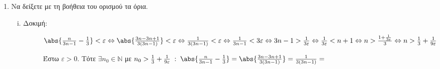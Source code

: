 \begin{enumerate}
            \item Να δείξετε με τη βοήθεια του ορισμού τα όρια.
                \begin{enumerate}[i)]
                    \item 
                        \begin{description}
                            \item [Δοκιμή:] $ \abs{\frac{n}{3n-1} - \frac{1}{3}} < 
                                \varepsilon \Leftrightarrow 
                                \abs{\frac{3n-3n+1}{3(3n-1)}} < \varepsilon 
                                \Leftrightarrow \frac{1}{3(3n-1)} < \varepsilon 
                                \Leftrightarrow \frac{1}{3n-1} < 3 \varepsilon 
                                \Leftrightarrow 3n -1 > \frac{1}{3 \varepsilon} 
                                \Leftrightarrow \frac{1}{3 \varepsilon} < n + 1 
                                \Leftrightarrow n > \frac{1+ \frac{1}{3 \varepsilon}}
                                {3} \Leftrightarrow n > \frac{1}{3} + 
                                \frac{1}{9 \varepsilon}   $

                                Έστω $ \varepsilon >0 $. Τότε $ \exists n_{0} \in 
                                \mathbb{N}$ με $ n_{0}> \frac{1}{3} + 
                                \frac{1}{9 \varepsilon} \; :
                                \; \abs{\frac{n}{3n-1} - \frac{1}{3}} = 
                                \abs{\frac{3n-3n+1}{3(3n-1)}} = \frac{1}{3(3n-1)} = $
                        \end{description}
                \end{enumerate}

\end{enumerate}






